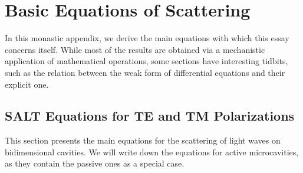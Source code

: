 \chapter{Basic Equations of Scattering}\label{sec:app.basicEquations}
In this monastic appendix, we derive the main equations with which
this essay concerns itself. While most of the results are
obtained via a mechanistic application of mathematical operations, 
some sections have interesting tidbits, such as the relation
between the weak form of differential equations and their 
explicit one.

\section{SALT Equations for TE and TM Polarizations}\label{sec:app.basicEquationScattering}
This section presents the main equations for the scattering
of light waves on bidimensional cavities. We will write
down the equations for active microcavities, as they contain
the passive ones as a special case. 


